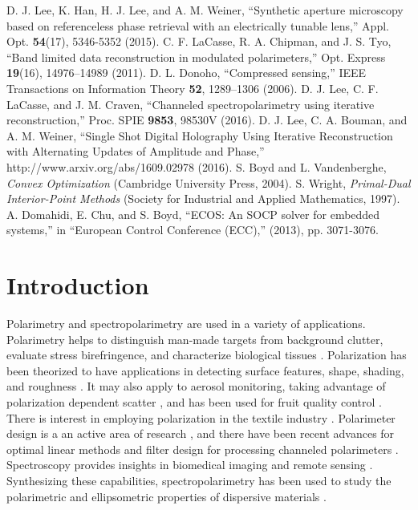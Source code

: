 \documentclass[10pt]{article}
\numberwithin{equation}{subsection}
\begin{document}
\begin{thebibliography}{9}
        D. J. Lee, K. Han, H. J. Lee, and A. M. Weiner, ``Synthetic aperture microscopy based on referenceless phase retrieval with an electrically tunable lens,'' Appl. Opt. \textbf{54}(17), 5346-5352 (2015).
        C. F. LaCasse, R. A. Chipman, and J. S. Tyo, ``Band limited data
    reconstruction in modulated polarimeters,'' Opt. Express \textbf{19}(16), 14976--14989
    (2011).
 D. L. Donoho, ``Compressed sensing,'' IEEE Transactions on Information Theory \textbf{52}, 1289--1306 (2006).
  D. J. Lee, C. F. LaCasse, and J. M. Craven, ``Channeled spectropolarimetry using iterative reconstruction,'' Proc. SPIE \textbf{9853}, 98530V (2016).
 D. J. Lee, C. A. Bouman, and A. M. Weiner, ``Single Shot Digital Holography Using Iterative Reconstruction with Alternating Updates of Amplitude and Phase,'' http://www.arxiv.org/abs/1609.02978 (2016).
 S. Boyd and L. Vandenberghe, \emph{Convex Optimization} (Cambridge University Press, 2004).
 S. Wright, \emph{Primal-Dual Interior-Point Methods} (Society for Industrial and Applied Mathematics, 1997).
 A. Domahidi, E. Chu, and S. Boyd, ``ECOS: An SOCP solver for embedded systems,'' in ``European Control Conference (ECC),'' (2013), pp. 3071-3076.
\end{thebibliography}

\section{Introduction}

Polarimetry and spectropolarimetry are used in a variety of applications.
Polarimetry helps to distinguish man-made targets from background clutter, evaluate stress birefringence, and characterize biological tissues \cite{Kudenov11}.
Polarization has been theorized to have applications in detecting surface features, shape, shading, and roughness \cite{Tyo06}.
It may also apply to aerosol monitoring, taking advantage of polarization dependent scatter \cite{Diner07}, and has been used for fruit quality control \cite{Boyer16}.
There is interest in employing polarization in the textile industry \cite{Peng12}.
Polarimeter design is a an active area of research \cite{Alenin14, Lowenstern16, Woodard16}, and there have been recent advances for optimal linear methods and filter design for processing channeled polarimeters \cite{LaCasse15, Alenin14}.
Spectroscopy provides insights in biomedical imaging and remote sensing \cite{Kudenov12}.
Synthesizing these capabilities, spectropolarimetry has been used to study the polarimetric and ellipsometric properties of dispersive materials \cite{Aspnes88, Oka99}.
\end{document}
